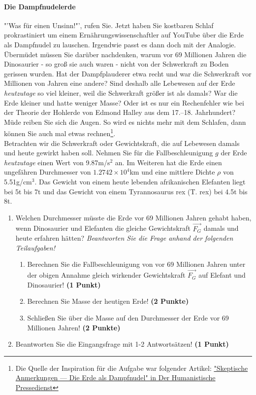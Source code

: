 \documentclass[a4paper, 9pt]{scrartcl}\usepackage[]{graphicx}\usepackage[]{xcolor}
\begin{document}
\paragraph{Die Dampfnudelerde}



"'Was für einen Unsinn!"', rufen Sie. Jetzt haben Sie kostbaren Schlaf prokrastiniert um einem Ernährungswissenschaftler auf YouTube über die Erde als Dampfnudel zu lauschen. Irgendwie passt es dann doch mit der Analogie. Übermüdet müssen Sie darüber nachdenken, warum vor 69 Millionen Jahren die Dinosaurier - so groß sie auch waren - nicht von der Schwerkraft zu Boden gerissen wurden. Hat der Dampfplauderer etwa recht und war die Schwerkraft vor Millionen von Jahren eine andere?  Sind deshalb alle Lebewesen auf der Erde \textit{heutzutage} so viel kleiner, weil die Schwerkraft größer ist als damals? War die Erde kleiner und hatte weniger Masse? Oder ist es nur ein Rechenfehler wie bei der Theorie der Hohlerde von Edmond Halley aus dem 17.–18. Jahrhundert? Müde reiben Sie sich die Augen. So wird es nichts mehr mit dem Schlafen, dann können Sie auch mal etwas rechnen\footnote{Die Quelle der Inspiration
  für die Aufgabe war folgender Artikel:
  \href{https://hpd.de/artikel/erde-dampfnudel-22236}{"Skeptische Anmerkungen --- Die Erde als Dampfnudel" in Der Humanistische Pressedienst}}.  \\

Betrachten wir die Schwerkraft oder Gewichtskraft, die auf Lebewesen damals und heute gewirkt haben soll. Nehmen Sie für die Fallbeschleunigung $g$ der Erde \textit{heutzutage} einen Wert von 9.87m/s$^2$ an. Im Weiteren hat die Erde einen ungefähren Durchmesser von \ensuremath{1.2742\times 10^{4}}km und eine mittlere Dichte $\rho$ von 5.51g/cm$^3$. Das Gewicht von einem heute lebenden afrikanischen Elefanten liegt bei 5t bis 7t und das Gewicht von einem Tyrannosaurus rex (T. rex) bei 4.5t bis 8t.

\begin{enumerate}
\item Welchen Durchmesser müsste die Erde vor 69 Millionen Jahren gehabt haben, wenn Dinosaurier und Elefanten die gleiche Gewichtskraft $\overrightarrow{F_G}$ damals und heute erfahren hätten? \textit{Beantworten Sie die Frage anhand der folgenden Teilaufgaben!}
\begin{enumerate}
\item Berechnen Sie die Fallbeschleunigung von vor 69 Millionen Jahren unter der obigen Annahme gleich wirkender Gewichtskraft $\overrightarrow{F_G}$ auf Elefant und Dinosaurier! \textbf{(1 Punkt)}
\item Berechnen Sie Masse der heutigen Erde! \textbf{(2 Punkte)}
\item Schließen Sie über die Masse auf den Durchmesser der Erde vor 69 Millionen Jahren! \textbf{(2 Punkte)}
\end{enumerate}
\item Beantworten Sie die Eingangsfrage mit 1-2 Antwortsätzen! \textbf{(1 Punkt)}
\end{enumerate}
\end{document}
